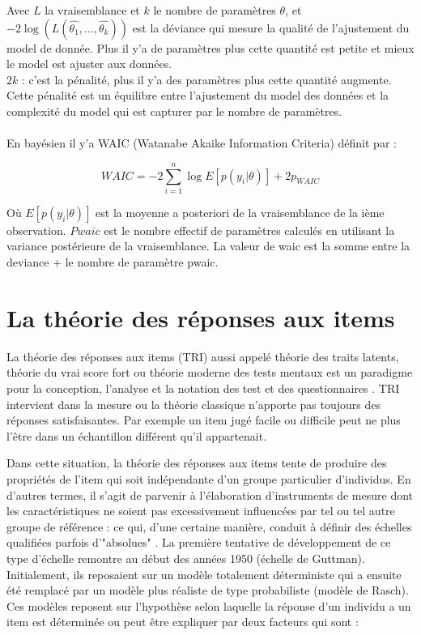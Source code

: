 Avec \(\displaystyle L \) la vraisemblance et \(\displaystyle k \) le nombre de paramètres \(\displaystyle \theta \), et \\
\(\displaystyle -2 \log (L(\widehat{\theta_{1}},...,\widehat{\theta_{k}} )) \) est la déviance qui mesure la qualité de l’ajustement du model de donnée. Plus il y’a de paramètres plus cette quantité est petite et mieux le model est ajuster aux données. \\
\(\displaystyle 2k \) : c’est la pénalité, plus il y’a des paramètres plus cette quantité augmente. Cette pénalité est un équilibre entre l’ajustement du model des données et la complexité du model qui est capturer par le nombre de paramètres. \\ \\

En bayésien il y’a WAIC (Watanabe Akaike Information Criteria) définit par :

\begin{equation}
	WAIC = -2\sum_{i=1}^{n} \log E\left[ p(y_{i}|\theta) \right] + 2p_{WAIC}
	\label{waic_formula}
\end{equation}

Où \(\displaystyle E\left[ p(y_{i}|\theta) \right] \) est la moyenne a posteriori de la vraisemblance de la ième observation.
\(\displaystyle Pwaic \)  est le nombre effectif de paramètres calculés en utilisant la variance postérieure de la vraisemblance.
La valeur de waic est la somme entre la deviance + le nombre de paramètre pwaic.

\section{La théorie des réponses aux items}
La théorie des réponses aux items (TRI) aussi appelé théorie des traits latents, théorie du vrai score fort ou théorie moderne des tests mentaux est un paradigme pour la conception, l’analyse et la notation des test et des questionnaires \cite{fisher1922mathematical}. TRI intervient dans la mesure ou la théorie classique n’apporte pas toujours des réponses satisfaisantes. Par exemple un item jugé facile ou difficile peut ne plus l’être dans un échantillon différent qu’il appartenait.

Dans cette situation, la théorie des réponses aux items tente de produire des propriétés de l’item qui soit indépendante d’un groupe particulier d’individus. En d'autres termes, il s'agit de parvenir à l'élaboration d'instruments de mesure dont les caractéristiques ne soient pas excessivement influencées par tel ou tel autre groupe de référence : ce qui, d'une certaine manière, conduit à définir des échelles qualifiées parfois d'"absolues" \cite{xcv_wiki}. La première tentative de développement de ce type d’échelle remontre au début des années 1950 (échelle de Guttman). Initialement, ils reposaient sur un modèle totalement déterministe qui a ensuite été remplacé par un modèle plus réaliste de type probabiliste (modèle de Rasch). Ces modèles reposent sur l’hypothèse selon laquelle la réponse d’un individu a un item est déterminée ou peut être expliquer par deux facteurs qui sont :


